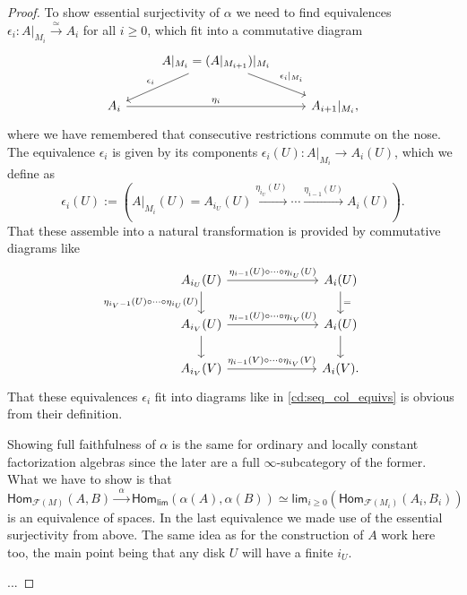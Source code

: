 \documentclass[../text]{subfiles}
\begin{document}
\begin{proof}
    To show essential surjectivity of $\alpha$ we need to find equivalences $\epsilon_i: A|_{M_i} \xrightarrow{\simeq} A_i$ for all $i \geq 0$, which fit into a commutative diagram
    \begin{equation}\label{cd:seq_col_equivs}
        \begin{tikzcd}
            & A|_{M_i} = (A|_{M_{i+1}})|_{M_i} \arrow[ld, "\epsilon_i"'] \arrow[rd, "\epsilon_i|_{M_i}"] & \\
            A_i \arrow[rr, "\eta_i"] & & A_{i+1}|_{M_i},
        \end{tikzcd}
    \end{equation}
    where we have remembered that consecutive restrictions commute on the nose. The equivalence $\epsilon_i$ is given by its components $\epsilon_i(U): A|_{M_i} \xrightarrow{} A_i(U)$, which we define as
    \begin{equation}
        \epsilon_i(U) := \left( A|_{M_i}(U) = A_{i_U}(U) \xrightarrow{\eta_{i_U}(U)} \cdots \xrightarrow{\eta_{i-1}(U)} A_i (U) \right).
    \end{equation}
    That these assemble into a natural transformation is provided by commutative diagrams like
    \begin{equation}
        \begin{tikzcd}[column sep = {2.5cm}]
            A_{i_U}(U) \arrow[d, "\eta_{i_V-1}(U) \circ \cdots \circ \eta_{i_U}(U)"'] \arrow[r, "\eta_{i-1}(U) \circ \cdots \circ \eta_{i_U}(U)"] & A_i(U) \arrow[d, "="] \\
            A_{i_V}(U) \arrow[d] \arrow[r, "\eta_{i-1}(U) \circ \cdots \circ \eta_{i_V}(U)"] & A_i (U) \arrow[d] \\
            A_{i_V}(V) \arrow[r, "\eta_{i-1}(V) \circ \cdots \circ \eta_{i_V}(V)"] & A_i (V).
        \end{tikzcd}
    \end{equation}
    That these equivalences $\epsilon_i$ fit into diagrams like in \cref{cd:seq_col_equivs} is obvious from their definition.

    Showing full faithfulness of $\alpha$ is the same for ordinary and locally constant factorization algebras since the later are a full $\infty$-subcategory of the former. What we have to show is that
    \begin{equation}
        \mathsf{Hom}_{\mathscr{F} (M)}(A, B) \xrightarrow{\ \ \alpha \ \ } \mathsf{Hom}_{\mathsf{lim}} (\alpha (A), \alpha(B)) \simeq \mathsf{lim}_{i \geq 0} (\mathsf{Hom}_{\mathscr{F}(M_i)} (A_i, B_i))
    \end{equation}
    is an equivalence of spaces. In the last equivalence we made use of the essential surjectivity from above. The same idea as for the construction of $A$ work here too, the main point being that any disk $U$ will have a finite $i_U$.
    
    ...
\end{proof}
\end{document}
